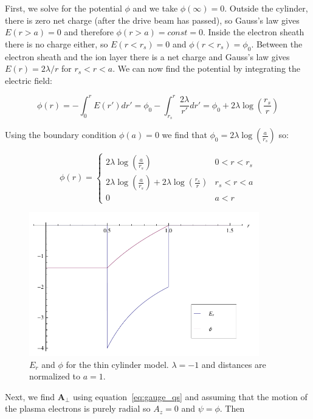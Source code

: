 \documentclass[aps,prl,preprint,groupedaddress]{revtex4-1}
\begin{document}
First, we solve for the potential $\phi$ and we take $\phi(\infty) = 0$. Outside the cylinder, there is zero net charge (after the drive beam has passed), so Gauss's law gives $E(r > a) = 0$ and therefore $\phi(r > a) = const = 0$. Inside the electron sheath there is no charge either, so $E(r < r_s) = 0$ and $\phi(r < r_s) = \phi_0$. Between the electron sheath and the ion layer there is a net charge and Gauss's law gives $E(r) = 2\lambda/r$ for $r_s < r < a$. We can now find the potential by integrating the electric field:

\begin{equation}\label{eq:thin_phi}
\phi(r) = -\int_0^r E(r') dr' = \phi_0 - \int_{r_s}^r \frac{2\lambda}{r'}dr' = \phi_0 + 2\lambda \log\left(\frac{r_s}{r}\right)
\end{equation}

Using the boundary condition $\phi(a) = 0$ we find that $\phi_0 = 2\lambda \log\left(\frac{a}{r_s}\right)$ so:

\begin{equation}\label{eq:phi_everywhere}
\phi(r) = \left\{ \begin{array}{lr}
2\lambda \log\left(\frac{a}{r_s}\right) & 0<r<r_s \\
2\lambda \log\left(\frac{a}{r_s}\right) + 2\lambda \log\left(\frac{r_s}{r}\right) & r_s<r<a \\
0 & a<r
\end{array} \right.
\end{equation}

\begin{figure}[ht]\label{fig:fields}
  \centering
    \includegraphics[width=100mm]{./figures/fields.pdf}
      \caption{$E_r$ and $\phi$ for the thin cylinder model. $\lambda = -1$ and distances are normalized to $a=1$.}
\end{figure}

Next, we find $\mathbf{A}_{\perp}$ using equation~\ref{eq:gauge_qs} and assuming that the motion of the plasma electrons is purely radial so $A_z = 0$ and $\psi = \phi$. Then
\end{document}
